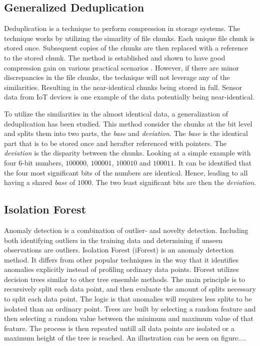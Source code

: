 
\subsection{Generalized Deduplication}
Deduplication is a technique to perform compression in storage systems. The technique works by utilizing the simarlity of file chunks. Each unique file chunk is stored once. Subsequent copies of the chunks are then replaced with a reference to the stored chunk. The method is established and shown to have good compression gain on various practical scenarios \cite{deduplication}. However, if there are minor discrepancies in the file chunks, the technique will not leverage any of the similarities. Resulting in the near-identical chunks being stored in full. Sensor data from IoT devices is one example of the data potentially being near-identical. 

To utilize the similarities in the almost identical data, a generalization of deduplication has been studied.     
This method consider the chunks at the bit level and splits them into two parts, the \textit{base} and \textit{deviation}. The \textit{base} is the identical part that is to be stored once and herafter referenced with pointers. The \textit{deviation} is the disparity between the chunks. Looking at a simple example with four 6-bit numbers, $100000$, $100001$, $100010$ and $100011$. It can be identified that the four most significant bits of the numbers are identical. Hence, leading to all having a shared \textit{base} of $1000$. The two least significant bits are then the \textit{deviation}\cite{gen-deduplication}.   

\subsection{Isolation Forest}
Anomaly detection is a combination of outlier- and novelty detection. Including both identifying outliers in the training data and determining if unseen observations are outliers. Isolation Forest (iForest) is an anomaly detection method. It differs from other popular techniques in the way that it identifies anomalies explicitly instead of profiling ordinary data points\cite{iforest}. IForest utilizes decision trees similar to other tree ensemble methods.
The main principle is to recursively split each data point, and then evaluate the amount of splits necessary to split each data point. The logic is that anomalies will requires less splits to be isolated than an ordinary point.  
Trees are built by selecting a random feature and then selecting a random value between the minimum and maximum value of that feature. The process is then repeated untill all data points are isolated or a maximum height of the tree is reached. An illustration can be seen on figure.... 